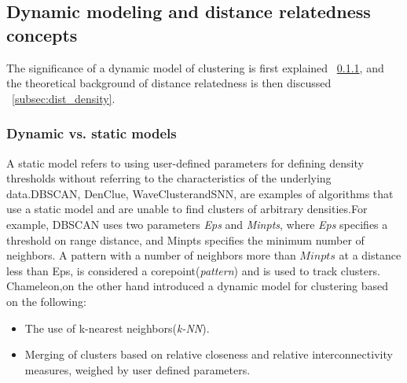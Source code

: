 \subsection{Dynamic modeling and distance relatedness concepts}\label{sec:background}

The significance of a dynamic model of clustering is first explained ~\ref{subsec:dynamic_static}, and the theoretical background of distance relatedness is then discussed ~\ref{subsec:dist_density}.

\subsubsection{Dynamic vs. static models}\label{subsec:dynamic_static} 
A static model refers to using user-defined parameters for defining density thresholds without referring to the characteristics of the underlying data.DBSCAN, DenClue, WaveClusterandSNN, are examples of algorithms that use a static model and are unable to find clusters of arbitrary densities.For example, DBSCAN uses two parameters \textit{Eps} and \textit{Minpts}, where \textit{Eps} specifies a threshold on range distance,
and Minpts specifies the minimum number of neighbors.
A pattern with a number of neighbors more than $Minpts$ at a distance less than Eps, is considered a corepoint(\textit{pattern}) and is used to track clusters. Chameleon,on the other hand introduced a dynamic model for clustering based on the following:
\begin{itemize}
\item The use of k-nearest neighbors(\textit{k-NN}).
\item Merging of clusters based on relative closeness and relative interconnectivity measures, weighed by user defined parameters.
\end{itemize}


